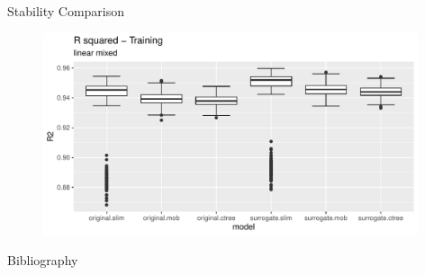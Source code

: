 \documentclass[9pt, xcolor=table]{beamer}
\begin{document}
\begin{frame}{Stability Comparison}
\begin{figure}
    \includegraphics[width=11cm]{Figures/Stability/linear_mixed/r2_train.pdf}
\end{figure}
\end{frame}


\begin{frame}{Bibliography}
    
    

\end{frame}
\end{document}
